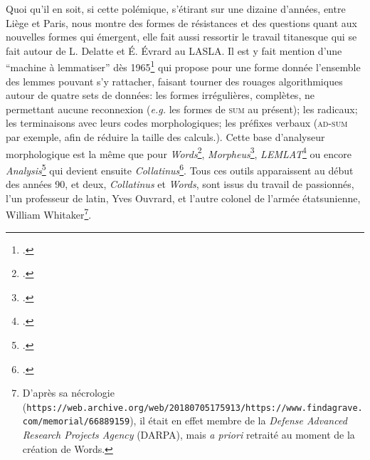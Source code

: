 Quoi qu'il en soit, si cette polémique, s'étirant sur une dizaine d'années, entre Liège et Paris, nous montre des formes de résistances et des questions quant aux nouvelles formes qui émergent, elle fait aussi ressortir le travail titanesque qui se fait autour de L. Delatte et É. Évrard au LASLA. Il est y fait mention d'une \enquote{machine à lemmatiser} dès 1965\footcite{delatte_programme_1965} qui propose pour une forme donnée l'ensemble des lemmes pouvant s'y rattacher, faisant tourner des rouages algorithmiques autour de quatre sets de données: les formes irrégulières, complètes, ne permettant aucune reconnexion (\textit{e.g.} les formes de \textsc{sum} au présent); les radicaux; les terminaisons avec leurs codes morphologiques; les préfixes verbaux (\textsc{ad-sum} par exemple, afin de réduire la taille des calculs.). Cette base d'analyseur morphologique est la même que pour \textit{Words}\footcite{whitaker_words_1993}, \textit{Morpheus}\footcite{crane_generating_1991}, \textit{LEMLAT}\footcite{bozzi_lemlat_1992} ou encore \textit{Analysis}\footcite{ouvrard_analysis_1992} qui devient ensuite \textit{Collatinus}\footcite{ouvrard_collatinus_1999}. Tous ces outils apparaissent au début des années 90, et deux, \textit{Collatinus} et \textit{Words}, sont issus du travail de passionnés, l'un professeur de latin, Yves Ouvrard, et l'autre colonel de l'armée étatsunienne, William Whitaker\footnote{D'après sa nécrologie (\texttt{https://web.archive.org/web/20180705175913/https://www.findagrave.com/memorial/66889159}), il était en effet membre de la \textit{Defense Advanced Research Projects Agency} (DARPA), mais \textit{a priori} retraité au moment de la création de Words.}.

